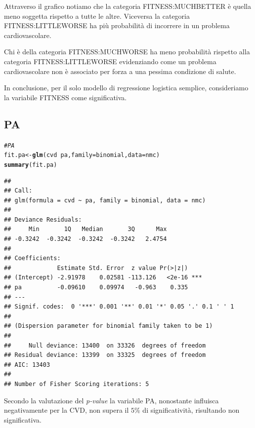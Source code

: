 \documentclass{article}\usepackage[]{graphicx}\usepackage[]{xcolor}
\makeatletter
\newcommand{\hlcom}[1]{\textcolor[rgb]{0.678,0.584,0.686}{\textit{#1}}}%
\newcommand{\hlopt}[1]{\textcolor[rgb]{0,0,0}{#1}}%
\newcommand{\hlstd}[1]{\textcolor[rgb]{0.345,0.345,0.345}{#1}}%
\newcommand{\hlkwb}[1]{\textcolor[rgb]{0.69,0.353,0.396}{#1}}%
\newcommand{\hlkwc}[1]{\textcolor[rgb]{0.333,0.667,0.333}{#1}}%
\newcommand{\hlkwd}[1]{\textcolor[rgb]{0.737,0.353,0.396}{\textbf{#1}}}%
\newenvironment{kframe}{%
 \def\at@end@of@kframe{}%
 \ifinner\ifhmode%
  \def\at@end@of@kframe{\end{minipage}}%
  \begin{minipage}{\columnwidth}%
 \fi\fi%
 \def\FrameCommand##1{\hskip\@totalleftmargin \hskip-\fboxsep
 \colorbox{shadecolor}{##1}\hskip-\fboxsep
     \hskip-\linewidth \hskip-\@totalleftmargin \hskip\columnwidth}%
 \MakeFramed {\advance\hsize-\width
   \@totalleftmargin\z@ \linewidth\hsize
   \@setminipage}}%
 {\par\unskip\endMakeFramed%
 \at@end@of@kframe}
\newenvironment{knitrout}{}{} %
\makeatother
\begin{document}
    Attraverso il grafico notiamo che la categoria FITNESS:MUCHBETTER è quella meno
    soggetta rispetto a tutte le altre. Viceversa la categoria FITNESS:LITTLEWORSE 
    ha più probabilità di incorrere in un problema cardiovascolare. \par
    
    Chi è della categoria FITNESS:MUCHWORSE ha meno probabilità rispetto alla 
    categoria FITNESS:LITTLEWORSE evidenziando come un problema cardiovascolare
    non è associato per forza a una pessima condizione di salute. \par
    
    In conclusione, per il solo modello di regressione logistica semplice,
    consideriamo la variabile FITNESS come significativa.
    
  \clearpage

  \subsection{PA}
\begin{knitrout}
\color{fgcolor}\begin{kframe}
\begin{alltt}
\hlcom{#PA}
\hlstd{fit.pa} \hlkwb{<-} \hlkwd{glm}\hlstd{(cvd}\hlopt{~}\hlstd{pa,} \hlkwc{family}\hlstd{=binomial,} \hlkwc{data}\hlstd{=nmc)}
\hlkwd{summary}\hlstd{(fit.pa)}
\end{alltt}
\begin{verbatim}
## 
## Call:
## glm(formula = cvd ~ pa, family = binomial, data = nmc)
## 
## Deviance Residuals: 
##     Min       1Q   Median       3Q      Max  
## -0.3242  -0.3242  -0.3242  -0.3242   2.4754  
## 
## Coefficients:
##             Estimate Std. Error  z value Pr(>|z|)    
## (Intercept) -2.91978    0.02581 -113.126   <2e-16 ***
## pa          -0.09610    0.09974   -0.963    0.335    
## ---
## Signif. codes:  0 '***' 0.001 '**' 0.01 '*' 0.05 '.' 0.1 ' ' 1
## 
## (Dispersion parameter for binomial family taken to be 1)
## 
##     Null deviance: 13400  on 33326  degrees of freedom
## Residual deviance: 13399  on 33325  degrees of freedom
## AIC: 13403
## 
## Number of Fisher Scoring iterations: 5
\end{verbatim}
\end{kframe}
\end{knitrout}
    
    Secondo la valutazione del \emph{p-value} la variabile PA, nonostante 
    influisca negativamente per la CVD, non supera il $5\%$ di significatività, 
    risultando non significativa.
    
\end{document}
